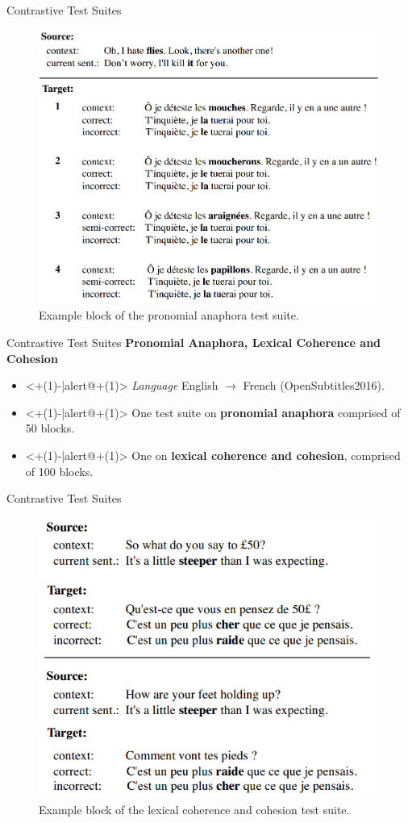 \begin{frame}{Contrastive Test Suites}
	\begin{figure}
		\centering
		\includegraphics[width=0.59\linewidth]{Images/anaphora_test_suite}
		\caption{Example block of the pronomial anaphora test suite.}
		\label{fig:anaphoratestsuite}
	\end{figure}
\end{frame}

\begin{frame}{Contrastive Test Suites}
	\textbf{Pronomial Anaphora, Lexical Coherence and Cohesion} \cite{bawden_evaluating_2018}
	\begin{itemize}
		\item<+(1)-|alert@+(1)> \textit{Language} English $\rightarrow$ French (OpenSubtitles2016).
		\item<+(1)-|alert@+(1)> One test suite on \textbf{pronomial anaphora} comprised of 50 blocks.
		\item<+(1)-|alert@+(1)> One on \textbf{lexical coherence and cohesion}, comprised of 100 blocks.
	\end{itemize}
\end{frame}


\begin{frame}{Contrastive Test Suites}
	\begin{figure}
		\centering
		\includegraphics[width=0.57\linewidth]{Images/coherence_test_suite}
		\caption{Example block of the lexical coherence and cohesion test suite.}
		\label{fig:coherencetestsuite}
	\end{figure}
\end{frame}



